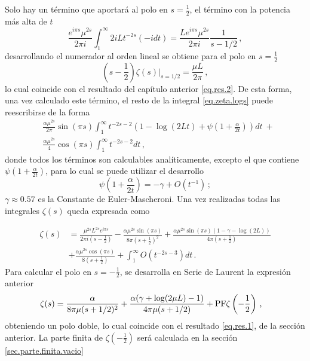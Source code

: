 Solo hay un término que aportará al polo en $s= \frac{1}{2}$, el término con la potencia más alta de $t$
\begin{equation}
    \frac{e^{i \pi s} \mu ^{2s} }{2 \pi i }
    \int _1 ^{\infty}
    2 i L    
    t ^{-2 s}
    (-i dt) =  
    \frac{L e^{i \pi s} \mu ^{2s}}{2 \pi i} \frac{1}{s-1/2   }
    	\, ,
\end{equation}
desarrollando el numerador al orden lineal se obtiene para el polo en $s= \frac{1}{2}$ 
\begin{equation}
	\left(s- \frac{1}{2} \right)
    \zeta (s) \Big| _{s=1/2} = \frac{\mu L }{2 \pi} 
    	\, ,
\end{equation}
lo cual coincide con el resultado del capítulo anterior \eqref{eq.res.2}.
De esta forma, una vez calculado este término, el resto de la integral \eqref{eq.zeta.logs} puede reescribirse de la forma
\begin{align}
    & \frac{\alpha \mu ^{2s} }{2 \pi} \sin(\pi s)
    \int _1 ^{\infty}
    t ^{-2 s-2} 
    \left(
    1 -  \log (2Lt) + \psi \left( 1 + \frac{\alpha}{2t} \right)
    \right) dt \ + 
    	\nonumber \\[5pt]
    &
    \frac{\alpha \mu ^{2s} }{4} 
    \cos (\pi s)
    \int _1 ^{\infty} t^{-2s-2} dt
    	\, ,
\end{align}
donde todos los términos son calculables analíticamente, excepto el que contiene $\psi \left( 1 + \frac{\alpha}{2t} \right)$, para lo cual se puede utilizar el desarrollo
\begin{equation}
    \psi \left(1 + \frac{\alpha}{2 t} \right) =
    - \gamma + O \left( t^{-1} \right)
    \, ;
\end{equation}
$\gamma \approx 0.57$ es la Constante de Euler-Mascheroni.  
Una vez realizadas todas las integrales $\zeta (s)$ queda expresada como  

\begin{align}
\nonumber
    \zeta  (s)  & = 
     \frac{\mu ^{2s} L ^{2 s} e ^{i \pi s}}{2 \pi i (s-\frac{1}{2})}  
    -\frac{\alpha \mu ^{2s} \sin(\pi s)}{8 \pi \left( s+\frac{1}{2} \right) ^2}  + 
    \frac{\alpha \mu ^{2s} \sin  (\pi s) (1 - \gamma -   \log (2 L))}{4 \pi (s+ \frac{1}{2} )} 
\\
\label{eq.laurent}
    & + \frac{\alpha \mu ^{2s} \cos(\pi s)}{8 (s+\frac{1}{2} )} +
    \int _1 ^{\infty} O \left( t ^{-2s-3} \right) dt
    	\, .
\end{align}
Para calcular el polo en $s=- \frac{1}{2}$, se desarrolla en Serie de Laurent la expresión anterior
\begin{align}
\label{eq.result.zeta.c}
    &\zeta  (s) =  \frac{\alpha}{8  \pi \mu (s+1/2)^2} +
    \frac{ \alpha ( \gamma  +  \log (2\mu L ) -1 ) }{4  \pi \mu (s+1/2) }  + 
	{\rm PF } \zeta \left( - \frac{1}{2} \right)
    	\, ,
\end{align}
obteniendo un polo doble, lo cual coincide con el resultado \eqref{eq.res.1}, de la sección anterior.
La parte finita de $ \zeta \left( - \frac{1}{2} \right)$ será calculada en la sección \ref{sec.parte.finita.vacio}

